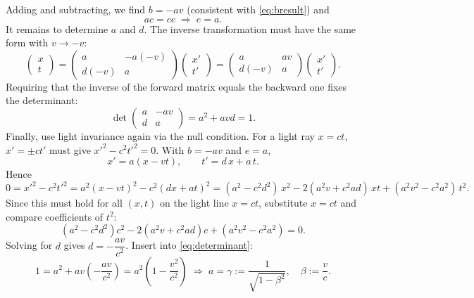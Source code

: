 \documentclass[12pt,
               open=any,
               twoside,
               a4paper,
               titlepage,
               bibliography=totoc,
               xcolor=dvipsnames,
               ]{scrartcl}
\theoremstyle{definition}
\theoremstyle{definition}
\begin{document}
			Adding and subtracting, we find $b=-a v$ (consistent with \autoref{eq:bresult}) and
			\begin{equation}
				ac = c e \;\Rightarrow\; e=a.
				\label{eq:eresult}
			\end{equation}
			It remains to determine $a$ and $d$. The inverse transformation must have the same form with $v\to -v$:
			\begin{equation}
				\begin{pmatrix} x \\ t \end{pmatrix}
				=
				\begin{pmatrix} a & -a(-v) \\ d(-v) & a \end{pmatrix}
				\begin{pmatrix} x' \\ t' \end{pmatrix}
				=
				\begin{pmatrix} a & a v \\ d(-v) & a \end{pmatrix}
				\begin{pmatrix} x' \\ t' \end{pmatrix}.
			\end{equation}
			Requiring that the inverse of the forward matrix equals the backward one fixes the determinant:
			\begin{equation}
				\det \begin{pmatrix} a & -a v \\ d & a \end{pmatrix} = a^2 + a v d = 1.
				\label{eq:determinant}
			\end{equation}
			Finally, use light invariance again via the null condition. For a light ray $x=ct$, $x'=\pm c t'$ must give $x'^2-c^2 t'^2=0$. With $b=-a v$ and $e=a$,
			$$x' = a(x - v t), \qquad t' = d\,x + a\,t.$$
			Hence
			$$0 = x'^2 - c^2 t'^2 = a^2(x-vt)^2 - c^2(d x + a t)^2 = (a^2 - c^2 d^2)\,x^2 - 2(a^2 v + c^2 a d)\,x t + (a^2 v^2 - c^2 a^2)\,t^2.$$
			Since this must hold for all $(x,t)$ on the light line $x=ct$, substitute $x=ct$ and compare coefficients of $t^2$:
			$$(a^2 - c^2 d^2)c^2 - 2(a^2 v + c^2 a d)c + (a^2 v^2 - c^2 a^2) = 0.$$
			Solving for $d$ gives $d = -\dfrac{a v}{c^2}$. Insert into \autoref{eq:determinant}:
			\begin{equation}
				1 = a^2 + a v \left(-\frac{a v}{c^2}\right) = a^2\!\left(1-\frac{v^2}{c^2}\right)
				\;\Rightarrow\;
				a = \boxed{\gamma := \frac{1}{\sqrt{1-\beta^2}}},\quad \boxed{\beta:=\frac{v}{c}}.
			\end{equation}
\end{document}
